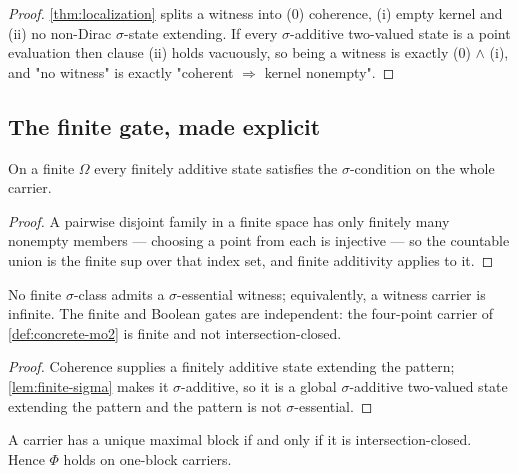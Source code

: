 \begin{proof}
  \leanok
  \ref{thm:localization} splits a witness into (0) coherence, (i) empty kernel
  and (ii) no non-Dirac $\sigma$-state extending. If every $\sigma$-additive
  two-valued state is a point evaluation then clause (ii) holds vacuously, so
  being a witness is exactly (0) $\wedge$ (i), and "no witness" is exactly
  "coherent $\Rightarrow$ kernel nonempty".
\end{proof}
\subsection{The finite gate, made explicit}

\begin{lemma}
  \label{lem:finite-sigma}
  \leanok
  On a finite $\Omega$ every finitely additive state satisfies the
  $\sigma$-condition on the whole carrier.
\end{lemma}

\begin{proof}
  \leanok
  A pairwise disjoint family in a finite space has only finitely many nonempty
  members --- choosing a point from each is injective --- so the countable union
  is the finite sup over that index set, and finite additivity applies to it.
\end{proof}

\begin{theorem}
  \label{thm:phi-finite}
  \leanok
  No finite $\sigma$-class admits a $\sigma$-essential witness; equivalently, a
  witness carrier is infinite. The finite and Boolean gates are independent: the
  four-point carrier of \ref{def:concrete-mo2} is finite and not
  intersection-closed.
\end{theorem}

\begin{proof}
  \leanok
  Coherence supplies a finitely additive state extending the pattern;
  \ref{lem:finite-sigma} makes it $\sigma$-additive, so it is a global
  $\sigma$-additive two-valued state extending the pattern and the pattern is
  not $\sigma$-essential.
\end{proof}
\begin{theorem}
  \label{thm:one-block-iff-boolean}
  \leanok
  A carrier has a unique maximal block if and only if it is intersection-closed.
  Hence $\Phi$ holds on one-block carriers.
\end{theorem}

